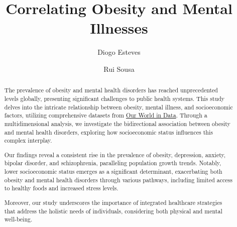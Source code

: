 \documentclass[runningheads]{llncs}
\begin{document}
%
\title{Correlating Obesity and Mental Illnesses}
%
\author{Diogo Esteves \and Rui Sousa}
%
%

\maketitle 
\begin{abstract}
The prevalence of obesity and mental health disorders has reached unprecedented levels globally, presenting significant challenges to public health systems. This study delves into the intricate relationship between obesity, mental illness, and socioeconomic factors, utilizing comprehensive datasets from \href{https://ourworldindata.org/}{Our World in Data}. Through a multidimensional analysis, we investigate the bidirectional association between obesity and mental health disorders, exploring how socioeconomic status influences this complex interplay.

Our findings reveal a consistent rise in the prevalence of obesity, depression, anxiety, bipolar disorder, and schizophrenia, paralleling population growth trends. Notably, lower socioeconomic status emerges as a significant determinant, exacerbating both obesity and mental health disorders through various pathways, including limited access to healthy foods and increased stress levels.

Moreover, our study underscores the importance of integrated healthcare strategies that address the holistic needs of individuals, considering both physical and mental well-being.

\end{abstract}
%
%
%
\end{document}
